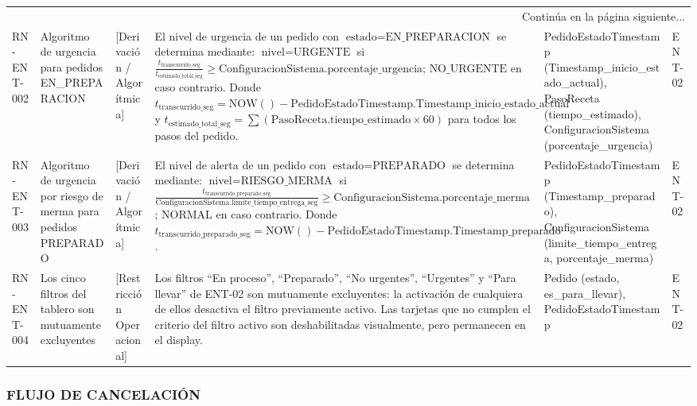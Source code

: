 \begin{landscape}
\begin{longtable}[c]{l p{2.1cm} p{2.1cm} p{8cm} p{4cm} p{3cm}}
\midrule
\multicolumn{6}{r}{\small Continúa en la página siguiente...} \\
\endfoot
\bottomrule
\endlastfoot

RN-ENT-002 & Algoritmo de urgencia para pedidos EN\_PREPARACION & [Derivación / Algorítmica] & El nivel de urgencia de un pedido con $\text{estado} = \text{EN\_PREPARACION}$ se determina mediante: $\text{nivel} = \text{URGENTE}$ si $\frac{t_{\text{transcurrido\_seg}}}{t_{\text{estimado\_total\_seg}}} \ge \text{ConfiguracionSistema.porcentaje\_urgencia}$; $\text{NO\_URGENTE}$ en caso contrario. Donde $t_{\text{transcurrido\_seg}} = \text{NOW}() - \text{PedidoEstadoTimestamp.Timestamp\_inicio\_estado\_actual}$ y $t_{\text{estimado\_total\_seg}} = \sum (\text{PasoReceta.tiempo\_estimado} \times 60)$ para todos los pasos del pedido. & PedidoEstadoTimestamp (Timestamp\_inicio\_estado\_actual), PasoReceta (tiempo\_estimado), ConfiguracionSistema (porcentaje\_urgencia) & ENT-02 \\
\addlinespace
RN-ENT-003 & Algoritmo de urgencia por riesgo de merma para pedidos PREPARADO & [Derivación / Algorítmica] & El nivel de alerta de un pedido con $\text{estado} = \text{PREPARADO}$ se determina mediante: $\text{nivel} = \text{RIESGO\_MERMA}$ si $\frac{t_{\text{transcurrido\_preparado\_seg}}}{\text{ConfiguracionSistema.limite\_tiempo\_entrega\_seg}} \ge \text{ConfiguracionSistema.porcentaje\_merma}$; $\text{NORMAL}$ en caso contrario. Donde $t_{\text{transcurrido\_preparado\_seg}} = \text{NOW}() - \text{PedidoEstadoTimestamp.Timestamp\_preparado}$. & PedidoEstadoTimestamp (Timestamp\_preparado), ConfiguracionSistema (limite\_tiempo\_entrega, porcentaje\_merma) & ENT-02 \\
\addlinespace
RN-ENT-004 & Los cinco filtros del tablero son mutuamente excluyentes & [Restricción Operacional] & Los filtros ``En proceso'', ``Preparado'', ``No urgentes'', ``Urgentes'' y ``Para llevar'' de ENT-02 son mutuamente excluyentes: la activación de cualquiera de ellos desactiva el filtro previamente activo. Las tarjetas que no cumplen el criterio del filtro activo son deshabilitadas visualmente, pero permanecen en el display. & Pedido (estado, es\_para\_llevar), PedidoEstadoTimestamp & ENT-02 \\
\end{longtable}
\endgroup

\subsubsection{FLUJO DE CANCELACIÓN}
\begingroup
\setlength{\LTleft}{\fill}
\setlength{\LTright}{\fill}


\end{landscape}
